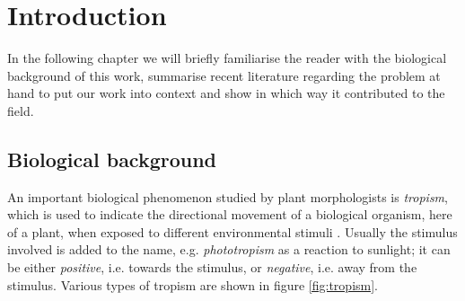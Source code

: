 
\chapter{Introduction} %

\label{introduction} %


\newcommand{\keyword}[1]{\textbf{#1}}
\newcommand{\tabhead}[1]{\textbf{#1}}
\newcommand{\code}[1]{\texttt{#1}}
\newcommand{\file}[1]{\texttt{\bfseries#1}}
\newcommand{\option}[1]{\texttt{\itshape#1}}



In the following chapter we will briefly familiarise the reader with the biological background of this work, summarise recent literature regarding the problem at hand to put our work into context and show in which way it contributed to the field.

\section{Biological background}

An important biological phenomenon studied by plant morphologists is \textit{tropism}, which is used to indicate the directional movement of a biological organism, here of a plant, when exposed to different environmental stimuli \cite{vandenbrink2014light}. Usually the stimulus involved is added to the name, e.g. \textit{phototropism} as a reaction to sunlight; it can be either \textit{positive}, i.e. towards the stimulus, or \textit{negative}, i.e. away from the stimulus. 
Various types of tropism are shown in figure \ref{fig:tropism}.

